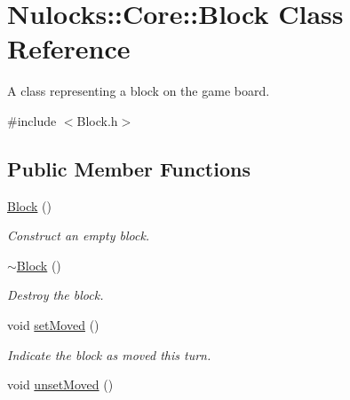 \hypertarget{class_nulocks_1_1_core_1_1_block}{\section{Nulocks\-:\-:Core\-:\-:Block Class Reference}
\label{class_nulocks_1_1_core_1_1_block}
}


A class representing a block on the game board.  




{\ttfamily \#include $<$Block.\-h$>$}

\subsection*{Public Member Functions}
\begin{DoxyCompactItemize}
\item 
\hypertarget{class_nulocks_1_1_core_1_1_block_a3f37123bfcbce5c7d034f2a8912b9d36}{\hyperlink{class_nulocks_1_1_core_1_1_block_a3f37123bfcbce5c7d034f2a8912b9d36}{Block} ()}\label{class_nulocks_1_1_core_1_1_block_a3f37123bfcbce5c7d034f2a8912b9d36}

\begin{DoxyCompactList}\small\item\em Construct an empty block. \end{DoxyCompactList}\item 
\hypertarget{class_nulocks_1_1_core_1_1_block_adb19f6f00db0de23bb87297a78eed85b}{\hyperlink{class_nulocks_1_1_core_1_1_block_adb19f6f00db0de23bb87297a78eed85b}{$\sim$\-Block} ()}\label{class_nulocks_1_1_core_1_1_block_adb19f6f00db0de23bb87297a78eed85b}

\begin{DoxyCompactList}\small\item\em Destroy the block. \end{DoxyCompactList}\item 
\hypertarget{class_nulocks_1_1_core_1_1_block_af14aacc817ba8215f75697a83ec4d56c}{void \hyperlink{class_nulocks_1_1_core_1_1_block_af14aacc817ba8215f75697a83ec4d56c}{set\-Moved} ()}\label{class_nulocks_1_1_core_1_1_block_af14aacc817ba8215f75697a83ec4d56c}

\begin{DoxyCompactList}\small\item\em Indicate the block as moved this turn. \end{DoxyCompactList}\item 
\hypertarget{class_nulocks_1_1_core_1_1_block_af647341409a4b1bc0c2b88356a40b5c6}{void \hyperlink{class_nulocks_1_1_core_1_1_block_af647341409a4b1bc0c2b88356a40b5c6}{unset\-Moved} ()}\label{class_nulocks_1_1_core_1_1_block_af647341409a4b1bc0c2b88356a40b5c6}


\end{DoxyCompactItemize}

